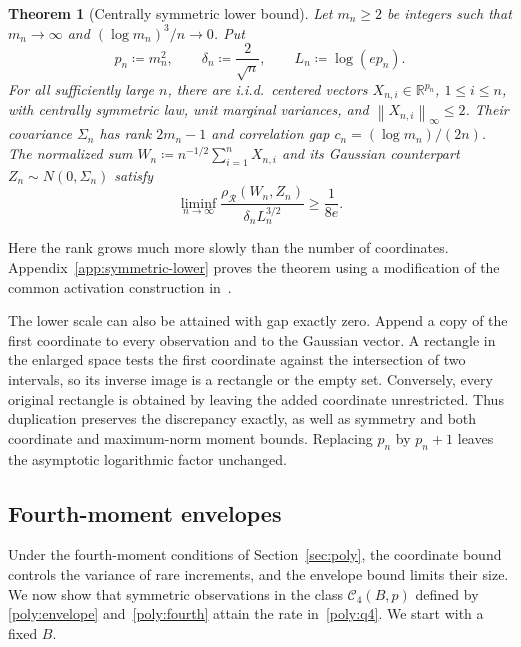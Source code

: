 \documentclass[11pt,letterpaper]{article}
\newtheorem{theorem}{Theorem}
\theoremstyle{remark}
\newcommand{\R}{\mathbb R}
\newcommand{\norm}[1]{\left\lVert#1\right\rVert}
\newcommand{\rh}{\rho_{\mathcal R}}
\begin{document}
\begin{theorem}[Centrally symmetric lower bound]\label{opt:symmetric-lower}
Let \(m_n\ge2\) be integers such that \(m_n\to\infty\) and
\((\log m_n)^3/n\to0\). Put
\[
 p_n\coloneqq m_n^2,\qquad \delta_n\coloneqq\frac2{\sqrt n},
 \qquad L_n\coloneqq\log(ep_n).
\]
For all sufficiently large \(n\), there are i.i.d.\ centered vectors
\(X_{n,i}\in\R^{p_n}\), \(1\le i\le n\), with centrally symmetric
law, unit marginal variances, and \(\norm{X_{n,i}}_\infty\le2\).
Their covariance \(\Sigma_n\) has rank \(2m_n-1\) and correlation
gap \(c_n=(\log m_n)/(2n)\). The normalized sum
\(W_n\coloneqq n^{-1/2}\sum_{i=1}^nX_{n,i}\) and its Gaussian
counterpart \(Z_n\sim N(0,\Sigma_n)\) satisfy
\[
 \liminf_{n\to\infty}
 \frac{\rh(W_n,Z_n)}{\delta_nL_n^{3/2}}\ge\frac1{8e}.
\]
\end{theorem}

Here the rank grows much more slowly than the number of coordinates.
Appendix~\ref{app:symmetric-lower} proves the theorem using a
modification of the common activation construction
in~\cite[Proposition~E.1]{FKLZ}.

The lower scale can also be attained with gap exactly zero. Append
a copy of the first coordinate to every observation and to the Gaussian
vector. A rectangle in the enlarged space tests the first coordinate
against the intersection of two intervals, so its inverse image is a
rectangle or the empty set. Conversely, every original rectangle is
obtained by leaving the added coordinate unrestricted. Thus duplication
preserves the discrepancy exactly, as well as symmetry and both
coordinate and maximum-norm moment bounds. Replacing \(p_n\) by
\(p_n+1\) leaves the asymptotic logarithmic factor unchanged.

\subsection{Fourth-moment envelopes}\label{opt:q4-comparison}

Under the fourth-moment conditions of Section~\ref{sec:poly}, the
coordinate bound controls the variance of rare increments, and the
envelope bound limits their size. We now show that symmetric observations in the class
\(\mathcal C_4(B,p)\) defined by
\eqref{poly:envelope} and~\eqref{poly:fourth} attain the rate
in~\eqref{poly:q4}. We start with a fixed \(B\).
\end{document}

